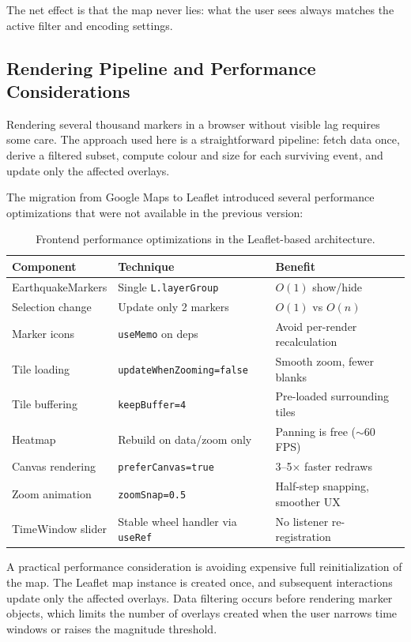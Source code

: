 \documentclass[12pt]{article}
\begin{document}
The net effect is that the map never lies: what the user sees always matches the active filter and encoding settings.

\subsection{Rendering Pipeline and Performance Considerations}
\label{subsec:frontend_performance}

Rendering several thousand markers in a browser without visible lag requires some care. The approach used here is a straightforward pipeline: fetch data once, derive a filtered subset, compute colour and size for each surviving event, and update only the affected overlays.

The migration from Google Maps to Leaflet introduced several performance optimizations that were not available in the previous version:

\begin{table}[H]
\centering
\begin{tabular}{l l l}
\hline
\textbf{Component} & \textbf{Technique} & \textbf{Benefit} \\
\hline
EarthquakeMarkers & Single \texttt{L.layerGroup} & $O(1)$ show/hide \\
Selection change  & Update only 2 markers & $O(1)$ vs $O(n)$ \\
Marker icons      & \texttt{useMemo} on deps & Avoid per-render recalculation \\
Tile loading      & \texttt{updateWhenZooming=false} & Smooth zoom, fewer blanks \\
Tile buffering    & \texttt{keepBuffer=4} & Pre-loaded surrounding tiles \\
Heatmap           & Rebuild on data/zoom only & Panning is free ($\sim$60\,FPS) \\
Canvas rendering  & \texttt{preferCanvas=true} & 3--5$\times$ faster redraws \\
Zoom animation    & \texttt{zoomSnap=0.5} & Half-step snapping, smoother UX \\
TimeWindow slider & Stable wheel handler via \texttt{useRef} & No listener re-registration \\
\hline
\end{tabular}
\caption{Frontend performance optimizations in the Leaflet-based architecture.}
\label{tab:frontend-perf}
\end{table}

A practical performance consideration is avoiding expensive full reinitialization of the map. The Leaflet map instance is created once, and subsequent interactions update only the affected overlays. Data filtering occurs before rendering marker objects, which limits the number of overlays created when the user narrows time windows or raises the magnitude threshold.
\end{document}

